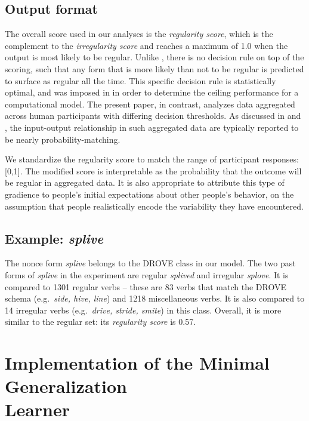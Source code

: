 \documentclass[12pt]{article}
\begin{document}
\subsection{Output format}

The overall score used in our analyses is the {\em regularity score}, which is the complement to the {\em irregularity score} and reaches a maximum of 1.0 when the output is most likely to be regular. Unlike \cite{dawdy2014learnability}, there is no decision rule on top of the scoring, such that any form that is more likely than not to be regular is predicted to surface as regular all the time. This specific decision rule is statistically optimal, and was imposed in \cite{dawdy2014learnability} in order to determine the ceiling performance for a computational model. The present paper, in contrast, analyzes data aggregated across human participants with differing decision thresholds. As discussed in \cite{schumacher2014reconciling} and \cite{schumacher2017prior}, the input-output relationship in such aggregated data are typically reported to be nearly probability-matching. 

We standardize the regularity score to match the range of participant responses: [0,1]. The modified score is interpretable as the probability that the outcome will be regular in aggregated data. It is also appropriate to attribute this type of gradience to people's initial expectations about other people's behavior, on the assumption that people realistically encode the variability they have encountered.

\subsection{Example: {\em splive}}


The nonce form {\em splive} belongs to the DROVE class in our model. The two past forms of {\em splive} in the experiment are regular {\em splived} and irregular {\em splove}. It is compared to 1301 regular verbs -- these are 83 verbs that match the DROVE schema (e.g.\ {\em side, hive, line}) and 1218 miscellaneous verbs. It is also compared to 14 irregular verbs (e.g.\ {\em drive, stride, smite}) in this class. Overall, it is more similar to the regular set: its {\em regularity score} is 0.57.   

\section{Implementation of the Minimal Generalization \\ Learner}\label{appendixmgl}
\end{document}
